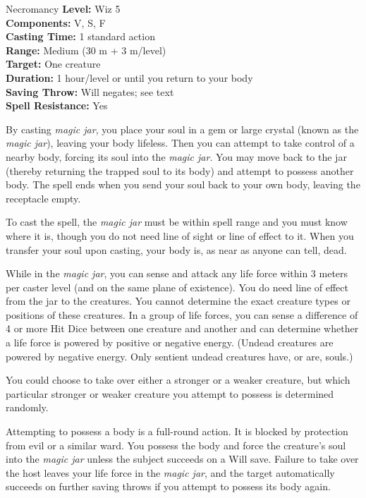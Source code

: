 {Necromancy}
{
	\textbf{Level:}
	Wiz 5\\
	\textbf{Components:}
	V, S, F\\
	\textbf{Casting Time:}
	1 standard action\\
	\textbf{Range:}
	Medium (30 m + 3 m/level)\\
	\textbf{Target:}
	One creature\\
	\textbf{Duration:}
	1 hour/level or until you return to your body\\
	\textbf{Saving Throw:}
	Will negates; see text\\
	\textbf{Spell Resistance:}
	Yes\\
}
{
	By casting \emph{magic jar}, you place your soul in a gem or large crystal (known as the \emph{magic jar}), leaving your body lifeless. Then you can attempt to take control of a nearby body, forcing its soul into the \emph{magic jar}. You may move back to the jar (thereby returning the trapped soul to its body) and attempt to possess another body. The spell ends when you send your soul back to your own body, leaving the receptacle empty.

	To cast the spell, the \emph{magic jar} must be within spell range and you must know where it is, though you do not need line of sight or line of effect to it. When you transfer your soul upon casting, your body is, as near as anyone can tell, dead.

	While in the \emph{magic jar}, you can sense and attack any life force within 3 meters per caster level (and on the same plane of existence). You do need line of effect from the jar to the creatures. You cannot determine the exact creature types or positions of these creatures. In a group of life forces, you can sense a difference of 4 or more Hit Dice between one creature and another and can determine whether a life force is powered by positive or negative energy. (Undead creatures are powered by negative energy. Only sentient undead creatures have, or are, souls.)

	You could choose to take over either a stronger or a weaker creature, but which particular stronger or weaker creature you attempt to possess is determined randomly.

	Attempting to possess a body is a full-round action. It is blocked by protection from evil or a similar ward. You possess the body and force the creature's soul into the \emph{magic jar} unless the subject succeeds on a Will save. Failure to take over the host leaves your life force in the \emph{magic jar}, and the target automatically succeeds on further saving throws if you attempt to possess its body again.

}
